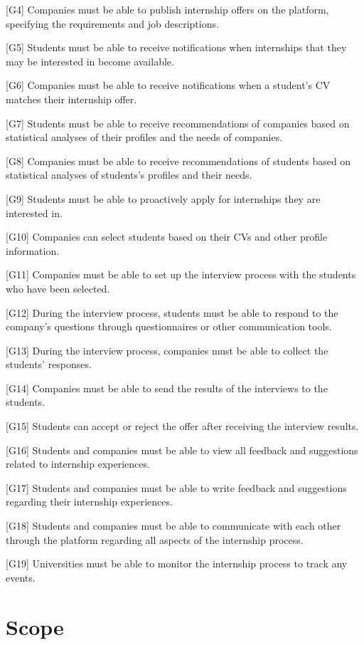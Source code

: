 [G4] Companies must be able to publish internship offers on the platform, specifying the requirements and job descriptions.

[G5] Students must be able to receive notifications when internships that they may be interested in become available.

[G6] Companies must be able to receive notifications when a student's CV matches their internship offer.

[G7] Students must be able to receive recommendations of companies based on statistical analyses of their profiles and the needs of companies.

[G8] Companies must be able to receive recommendations of students based on statistical analyses of students's profiles and their needs.

[G9] Students must be able to proactively apply for internships they are interested in.

[G10] Companies can select students based on their CVs and other profile information.

[G11] Companies must be able to set up the interview process with the students who have been selected.

[G12] During the interview process, students must be able to respond to the company's questions through questionnaires or other communication tools.

[G13] During the interview process, companies must be able to collect the students' responses.

[G14] Companies must be able to send the results of the interviews to the students.

[G15] Students can accept or reject the offer after receiving the interview results.

[G16] Students and companies must be able to view all feedback and suggestions related to internship experiences.

[G17] Students and companies must be able to write feedback and suggestions regarding their internship experiences.

[G18] Students and companies must be able to communicate with each other through the platform regarding all aspects of the internship process.

[G19] Universities must be able to monitor the internship process to track any events. 


\newpage
\section{Scope}\label{sec:scope}
